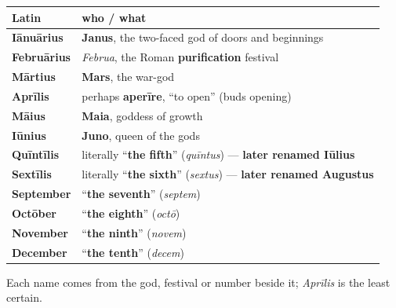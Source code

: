 \begin{cousinweb}
\noindent
\begin{tabularx}{\linewidth}{@{}>{\raggedright\arraybackslash}X>{\raggedright\arraybackslash}X@{}}
\toprule
\textbf{Latin} & \textbf{who / what} \\
\midrule
\textbf{Iānuārius} & \textbf{Janus}, the two-faced god of doors and beginnings \\
\textbf{Februārius} & \emph{Februa}, the Roman \textbf{purification} festival \\
\textbf{Mārtius} & \textbf{Mars}, the war-god \\
\textbf{Aprīlis} & perhaps \textbf{aperīre}, \textquotedblleft{}to open\textquotedblright{} (buds opening) \\
\textbf{Māius} & \textbf{Maia}, goddess of growth \\
\textbf{Iūnius} & \textbf{Juno}, queen of the gods \\
\textbf{Quīntīlis} & literally \textquotedblleft{}\textbf{the fifth}\textquotedblright{} (\emph{quīntus}) — \textbf{later renamed Iūlius} \\
\textbf{Sextīlis} & literally \textquotedblleft{}\textbf{the sixth}\textquotedblright{} (\emph{sextus}) — \textbf{later renamed Augustus} \\
\textbf{September} & \textquotedblleft{}\textbf{the seventh}\textquotedblright{} (\emph{septem}) \\
\textbf{Octōber} & \textquotedblleft{}\textbf{the eighth}\textquotedblright{} (\emph{octō}) \\
\textbf{November} & \textquotedblleft{}\textbf{the ninth}\textquotedblright{} (\emph{novem}) \\
\textbf{December} & \textquotedblleft{}\textbf{the tenth}\textquotedblright{} (\emph{decem}) \\
\bottomrule
\end{tabularx}

Each name comes from the god, festival or number beside it; \emph{Aprīlis} is the least certain.
\end{cousinweb}

